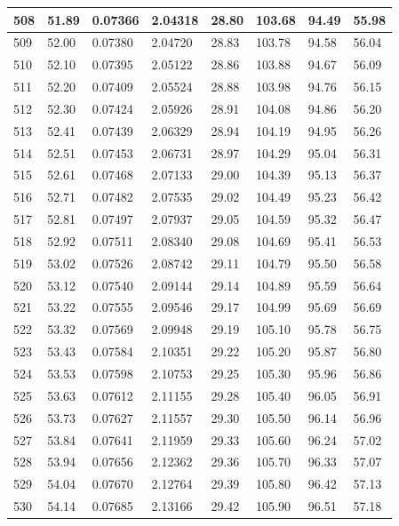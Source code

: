 \documentclass[12pt,a4paper,twoside]{article}
\begin{document}
\begin{center}
\begin{longtable}{l l l l | l l l l}
508 & 51.89 & 0.07366 & 2.04318 & 28.80 & 103.68 & 94.49 & 55.98 \\ \hline
509 & 52.00 & 0.07380 & 2.04720 & 28.83 & 103.78 & 94.58 & 56.04 \\ \hline
510 & 52.10 & 0.07395 & 2.05122 & 28.86 & 103.88 & 94.67 & 56.09 \\ \hline
511 & 52.20 & 0.07409 & 2.05524 & 28.88 & 103.98 & 94.76 & 56.15 \\ \hline
512 & 52.30 & 0.07424 & 2.05926 & 28.91 & 104.08 & 94.86 & 56.20 \\ \hline
513 & 52.41 & 0.07439 & 2.06329 & 28.94 & 104.19 & 94.95 & 56.26 \\ \hline
514 & 52.51 & 0.07453 & 2.06731 & 28.97 & 104.29 & 95.04 & 56.31 \\ \hline
515 & 52.61 & 0.07468 & 2.07133 & 29.00 & 104.39 & 95.13 & 56.37 \\ \hline
516 & 52.71 & 0.07482 & 2.07535 & 29.02 & 104.49 & 95.23 & 56.42 \\ \hline
517 & 52.81 & 0.07497 & 2.07937 & 29.05 & 104.59 & 95.32 & 56.47 \\ \hline
518 & 52.92 & 0.07511 & 2.08340 & 29.08 & 104.69 & 95.41 & 56.53 \\ \hline
519 & 53.02 & 0.07526 & 2.08742 & 29.11 & 104.79 & 95.50 & 56.58 \\ \hline
520 & 53.12 & 0.07540 & 2.09144 & 29.14 & 104.89 & 95.59 & 56.64 \\ \hline
521 & 53.22 & 0.07555 & 2.09546 & 29.17 & 104.99 & 95.69 & 56.69 \\ \hline
522 & 53.32 & 0.07569 & 2.09948 & 29.19 & 105.10 & 95.78 & 56.75 \\ \hline
523 & 53.43 & 0.07584 & 2.10351 & 29.22 & 105.20 & 95.87 & 56.80 \\ \hline
524 & 53.53 & 0.07598 & 2.10753 & 29.25 & 105.30 & 95.96 & 56.86 \\ \hline
525 & 53.63 & 0.07612 & 2.11155 & 29.28 & 105.40 & 96.05 & 56.91 \\ \hline
526 & 53.73 & 0.07627 & 2.11557 & 29.30 & 105.50 & 96.14 & 56.96 \\ \hline
527 & 53.84 & 0.07641 & 2.11959 & 29.33 & 105.60 & 96.24 & 57.02 \\ \hline
528 & 53.94 & 0.07656 & 2.12362 & 29.36 & 105.70 & 96.33 & 57.07 \\ \hline
529 & 54.04 & 0.07670 & 2.12764 & 29.39 & 105.80 & 96.42 & 57.13 \\ \hline
530 & 54.14 & 0.07685 & 2.13166 & 29.42 & 105.90 & 96.51 & 57.18 \\ \hline

\end{longtable}
\end{center}
\end{document}
